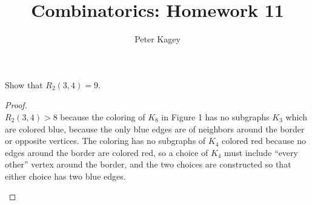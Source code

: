 \documentclass{article}
\newenvironment{problem}[2][Problem]{\begin{trivlist}
\item[\hskip \labelsep {\bfseries #1}\hskip \labelsep {\bfseries #2.}]}{\end{trivlist}}
\begin{document}
\title{Combinatorics: Homework 11}
\author{Peter Kagey}

\maketitle

\begin{problem}{1}
  Show that $R_2(3,4) = 9$.
\end{problem}

\begin{proof} $ $ \\
  $R_2(3,4) > 8$ because the coloring of $K_8$ in Figure 1 has no subgraphs
  $K_3$ which are colored blue, because the only blue edges are of neighbors
  around the border or opposite vertices. The coloring has no subgraphs of $K_4$
  colored red because no edges around the border are colored red, so a choice
  of $K_4$ must include ``every other'' vertex around the border, and the two
  choices are constructed so that either choice has two blue edges.
  \begin{figure}[h]
    \center
\end{figure}
\end{proof}
\end{document}
